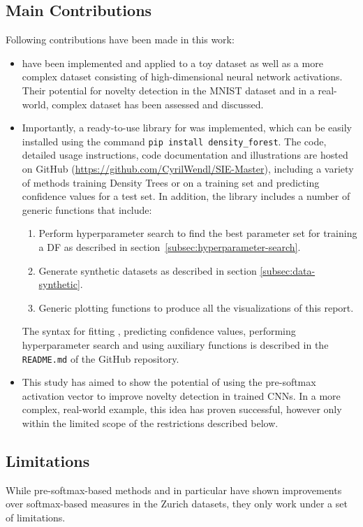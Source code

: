 \documentclass[10pt]{article}
\begin{document}
\subsection{Main Contributions}
\label{subsec:contributions}

Following contributions have been made in this work:
\begin{itemize}
	\item {} have been implemented and applied to a toy dataset as well as a more complex dataset consisting of high-dimensional neural network activations. Their potential for novelty detection in the \gls{MNIST} dataset and in a real-world, complex dataset has been assessed and discussed.
	\item Importantly, a ready-to-use library for  was implemented, which can be easily installed using the command \texttt{pip install density\_forest}. The code, detailed usage instructions, code documentation and illustrations are hosted on GitHub (\url{https://github.com/CyrilWendl/SIE-Master}), including a variety of methods training Density Trees or  on a training set and predicting confidence values for a test set. In addition, the library includes a number of generic functions that include:
	\begin{enumerate}
		\item Perform hyperparameter search to find the best parameter set for training a \acrlong{DF} as described in section \ref{subsec:hyperparameter-search}.
		\item Generate synthetic datasets as described in section \ref{subsec:data-synthetic}.
		\item Generic plotting functions to produce all the visualizations of this report.
	\end{enumerate}
	The syntax for fitting , predicting confidence values, performing hyperparameter search and using auxiliary functions is described in the \texttt{README.md} of the GitHub repository.
	\item This study has aimed to show the potential of using the pre-softmax activation vector to improve novelty detection in trained \glspl{CNN}. In a more complex, real-world example, this idea has proven successful, however only within the limited scope of the restrictions described below.
\end{itemize}

\subsection{Limitations}
While pre-softmax-based methods and  in particular have shown improvements over softmax-based measures in the Zurich datasets, they only work under a set of limitations.
\end{document}
